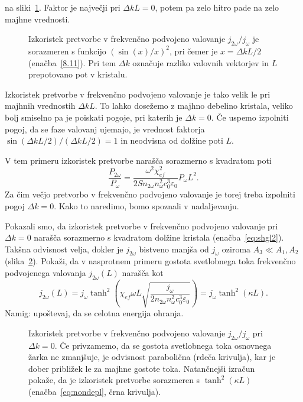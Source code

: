 na sliki~\ref{fig:shg2}. Faktor je največji pri $\Delta kL = 0$, potem pa zelo hitro
pade na zelo majhne vrednosti. 
\begin{figure}[ht]
\centering
\def\svgwidth{72truemm} 

\caption{Izkoristek pretvorbe v frekvenčno podvojeno valovanje $j_{2\omega}/j_\omega$ je 
sorazmeren s funkcijo $(\sin(x)/x)^2$,
pri čemer je $x = \Delta k L/2$ (enačba~\ref{8.11}). 
Pri tem $\Delta k$ označuje razliko valovnih vektorjev in
$L$ prepotovano pot v kristalu.}
\label{fig:shg2}
\end{figure}
Izkoristek pretvorbe v frekvenčno podvojeno valovanje je tako velik le pri  majhnih vred\-no\-stih 
$\Delta kL$. To lahko dosežemo z majhno debelino kristala, veliko bolj smiselno
pa je poiskati pogoje, pri katerih je $\Delta k = 0$. Če uspemo izpolniti pogoj, da
se faze valovanj ujemajo, je vrednost faktorja 
$\sin(\Delta kL/2)/(\Delta kL/2)=1$ in neodvisna od dolžine poti $L$.

V tem primeru izkoristek pretvorbe narašča sorazmerno s kvadratom poti
\begin{equation}
\frac{P_{2\omega}}{P_{\omega}}=
\frac{\omega^2 \chi_{ef}^2}{2 S n_{2\omega} n_\omega^2c_0^3\varepsilon_0} P_\omega L^2.
\label{eq:shgl2}
\end{equation}
Za čim večjo pretvorbo v frekvenčno podvojeno valovanje je torej treba 
izpolniti pogoj $\Delta k = 0$. Kako to naredimo,
bomo spoznali v nadaljevanju.

\begin{definition}
\label{deplet}
Pokazali smo, da izkoristek pretvorbe v frekvenčno podvojeno valovanje 
pri $\Delta k = 0$  narašča sorazmerno s kvadratom 
dolžine kristala (enačba~\ref{eq:shgl2}). Takšna odvisnost velja, 
dokler je $j_{2\omega}$ bistveno manjša od $j_{\omega}$ oziroma $A_3 \ll A_1, A_2$ (slika~\ref{fig:shg2dep}). 
Pokaži, da v nasprotnem primeru gostota svetlobnega toka frekvenčno
podvojenega valovanja $j_{2\omega}(L)$ narašča kot
\begin{equation}
j_{2\omega} (L) = j_\omega \tanh^2 \left(\chi_{ef}\omega L \sqrt{\frac{j_\omega}
{2 n_{2\omega} n_\omega^2 c_0^3 \varepsilon_0}} \right) = j_\omega \tanh^2(\kappa L).
\label{eq:nondepl}
\end{equation}
Namig: upoštevaj, da se celotna energija ohranja.
\end{definition}

\begin{figure}[ht]
\centering
\def\svgwidth{72truemm} 

\caption{Izkoristek pretvorbe v frekvenčno podvojeno valovanje $j_{2\omega}/j_\omega$ 
pri $\Delta k = 0$.
Če privzamemo, da se gostota svetlobnega toka osnovnega žarka ne zmanjšuje, 
je odvisnost parabolična (rdeča krivulja), kar 
je dober približek le za majhne gostote toka. Natančnejši izračun pokaže, da je izkoristek 
pretvorbe sorazmeren s $\tanh^2(\kappa L)$ (enačba~\ref{eq:nondepl}, črna krivulja).}
\label{fig:shg2dep}
\end{figure}

